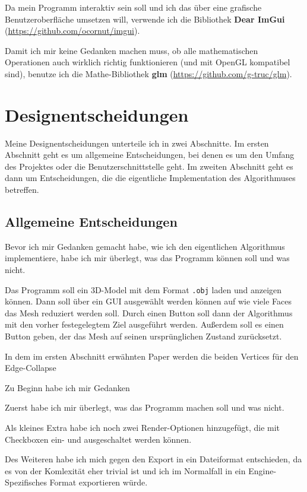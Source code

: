 \documentclass[a4paper,12pt]{book}
\begin{document}
Da mein Programm interaktiv sein soll und ich das über eine grafische Benutzeroberfläche umsetzen will, verwende ich die Bibliothek \textbf{Dear ImGui} (\url{https://github.com/ocornut/imgui}).

Damit ich mir keine Gedanken machen muss, ob alle mathematischen Operationen auch wirklich richtig funktionieren (und mit OpenGL kompatibel sind), benutze ich die Mathe-Bibliothek \textbf{glm} (\url{https://github.com/g-truc/glm}).

\section*{Designentscheidungen}

Meine Designentscheidungen unterteile ich in zwei Abschnitte. Im ersten Abschnitt geht es um allgemeine Entscheidungen, bei denen es um den Umfang des Projektes oder die Benutzerschnittstelle geht. Im zweiten Abschnitt geht es dann um Entscheidungen, die die eigentliche Implementation des Algorithmuses betreffen.

\subsection*{Allgemeine Entscheidungen}

Bevor ich mir Gedanken gemacht habe, wie ich den eigentlichen Algorithmus implementiere, habe ich mir überlegt, was das Programm können soll und was nicht. 

Das Programm soll ein 3D-Model mit dem Format \texttt{.obj} laden und anzeigen können. Dann soll über ein GUI ausgewählt werden können auf wie viele Faces das Mesh reduziert werden soll. Durch einen Button soll dann der Algorithmus mit den vorher festegelegtem Ziel ausgeführt werden. Außerdem soll es einen Button geben, der das Mesh auf seinen ursprünglichen Zustand zurücksetzt.

In dem im ersten Abschnitt erwähnten Paper werden die beiden Vertices für den Edge-Collapse 

Zu Beginn habe ich mir Gedanken 

Zuerst habe ich mir überlegt, was das Programm machen soll und was nicht. 

Als kleines Extra habe ich noch zwei Render-Optionen hinzugefügt, die mit Checkboxen ein- und ausgeschaltet werden können.

Des Weiteren habe ich mich gegen den Export in ein Dateiformat entschieden, da es von der Komlexität eher trivial ist und ich im Normalfall in ein Engine-Spezifisches Format exportieren würde.
\end{document}

